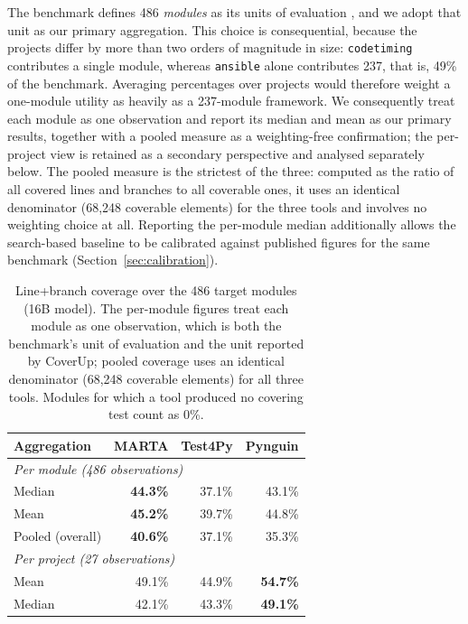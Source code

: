The benchmark defines 486 \emph{modules} as its units of evaluation
\cite{lemieux2023codamosa}, and we adopt that unit as our primary aggregation. This
choice is consequential, because the projects differ by more than two orders of
magnitude in size: \texttt{codetiming} contributes a single module, whereas
\texttt{ansible} alone contributes 237, that is, 49\% of the benchmark. Averaging
percentages over projects would therefore weight a one-module utility as heavily as a
237-module framework. We consequently treat each module as one observation and report
its median and mean as our primary results, together with a pooled measure as a
weighting-free confirmation; the per-project view is retained as a secondary
perspective and analysed separately below. The pooled measure is the strictest of the
three: computed as the ratio of all covered lines and branches to all coverable ones,
it uses an identical denominator (68{,}248 coverable elements) for the three tools and
involves no weighting choice at all. Reporting the per-module median additionally
allows the search-based baseline to be calibrated against published figures for the
same benchmark (Section~\ref{sec:calibration}).

\begin{table}[htpb]
\centering
\caption{Line+branch coverage over the 486 target modules (16B model). The
per-module figures treat each module as one observation, which is both the
benchmark's unit of evaluation and the unit reported by CoverUp; pooled coverage
uses an identical denominator (68{,}248 coverable elements) for all three tools.
Modules for which a tool produced no covering test count as 0\%.}
\label{tab:coverage}
\begin{tabular}{lrrr}
\hline
\textbf{Aggregation} & \textbf{MARTA} & \textbf{Test4Py} & \textbf{Pynguin} \\
\hline
\multicolumn{4}{l}{\textit{Per module (486 observations)}} \\
\quad Median            & \textbf{44.3\%} & 37.1\% & 43.1\% \\
\quad Mean              & \textbf{45.2\%} & 39.7\% & 44.8\% \\
\quad Pooled (overall)  & \textbf{40.6\%} & 37.1\% & 35.3\% \\
\hline
\multicolumn{4}{l}{\textit{Per project (27 observations)}} \\
\quad Mean              & 49.1\%          & 44.9\% & \textbf{54.7\%} \\
\quad Median            & 42.1\%          & 43.3\% & \textbf{49.1\%} \\
\hline
\end{tabular}
\end{table}

